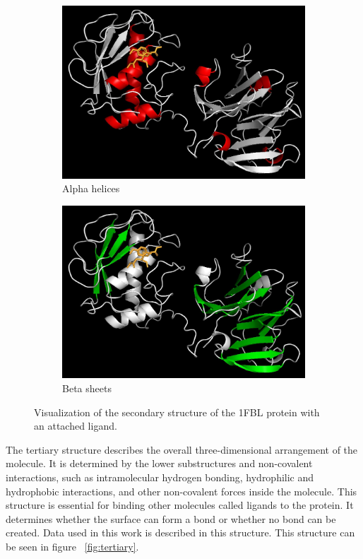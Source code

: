 \begin{figure}%
\begin{subfigure}{0.45\textwidth}
    \centering
    \includegraphics[width=1\linewidth]{alpha_helix.png}
    \caption{Alpha helices}
\end{subfigure}%
\begin{subfigure}{0.45\textwidth}
    \centering
    \includegraphics[width=1\linewidth]{beta_sheets.png}
    \caption{Beta sheets}
\end{subfigure}
\caption{Visualization of the secondary structure of the 1FBL protein with an attached ligand. }
\label{fig:secondary}
\end{figure}

The tertiary structure describes the overall three-dimensional arrangement of the molecule. It is determined by the lower substructures and non-covalent interactions, such as intramolecular hydrogen bonding, hydrophilic and hydrophobic interactions, and other non-covalent forces inside the molecule. This structure is essential for binding other molecules called ligands to the protein. It determines whether the surface can form a bond or whether no bond can be created. Data used in this work is described in this structure. This structure can be seen in figure ~\ref{fig:tertiary}.


